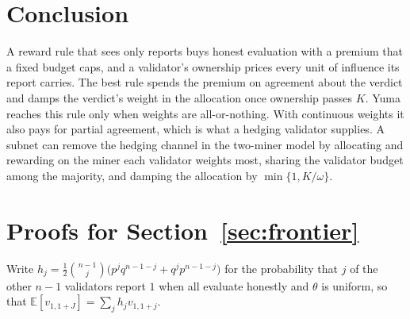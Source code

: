 \documentclass[sigconf,anonymous,review]{acmart}
\numberwithin{equation}{section}
\newcommand{\E}{\mathbb{E}}
\begin{document}
\begin{table}[t]
\caption{A single zero-owner validator hedges with $h=0.1$.
$\Delta v/V$ is its payment gain as a fraction of the validator budget;
$\Delta Q$ is the change in the share paid to the best miner.
Payoff and quality entries are multiplied by $10^3$; brackets are paired, pointwise
95\% Monte Carlo intervals. Bond memory is off.}
\label{tab:single-hedge}
\centering
\small

\end{table}

\section{Conclusion}
\label{sec:conclusion}

A reward rule that sees only reports buys honest evaluation with a premium
that a fixed budget caps, and a validator's ownership prices every unit of
influence its report carries. The best rule spends the premium on agreement
about the verdict and damps the verdict's weight in the allocation once
ownership passes $K$. Yuma reaches this rule only when weights are
all-or-nothing. With continuous weights it also pays for partial agreement,
which is what a hedging validator supplies. A subnet can remove the hedging
channel in the two-miner model by allocating and rewarding on the miner
each validator weights most, sharing the validator budget among the majority,
and damping the allocation by $\min\{1,K/\omega\}$.




\appendix

\section{Proofs for Section~\ref{sec:frontier}}
\label{app:frontier}

Write $h_j=\frac12\binom{n-1}{j}\bigl(p^jq^{n-1-j}+q^jp^{n-1-j}\bigr)$ for the
probability that $j$ of the other $n-1$ validators report $1$ when all evaluate
honestly and $\theta$ is uniform, so that $\E[v_{1,1+J}]=\sum_jh_jv_{1,1+j}$.
\end{document}
